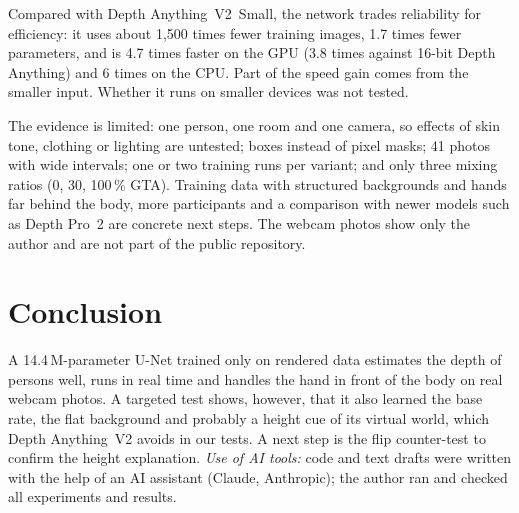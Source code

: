 \documentclass[../../proceedings/main.tex]{subfiles}
\begin{document}
\begin{refsection}
Compared with Depth Anything~V2~Small, the network trades reliability for
efficiency: it uses about 1{,}500 times fewer training images, 1.7 times fewer
parameters, and is 4.7 times faster on the GPU (3.8 times against 16-bit
Depth Anything) and 6 times on the CPU. Part of the speed gain comes from the
smaller input. Whether it runs on smaller devices was not tested.

The evidence is limited: one person, one room and one camera, so effects of
skin tone, clothing or lighting are untested; boxes instead of pixel masks; 41 photos with wide intervals; one or two training runs per
variant; and only three mixing ratios (0, 30, 100\,\% GTA). Training data with
structured backgrounds and hands far behind the body, more participants and a
comparison with newer models such as Depth Pro~2 are concrete next steps.
The webcam photos show only the author and are not part of the public
repository.

\section{Conclusion}
A 14.4\,M-parameter U-Net trained only on rendered data estimates the depth of
persons well, runs in real time and handles the hand in front of the body on
real webcam photos. A targeted test shows, however, that it also learned the
base rate, the flat background and probably a height cue of its virtual world,
which Depth Anything~V2 avoids in our tests. A next step is the flip
counter-test to confirm the height explanation. \emph{Use of AI tools:} code
and text drafts were written with the help of an AI assistant (Claude,
Anthropic); the author ran and checked all experiments and results.

\printbibliography[heading=subbibliography,title={References}]
\end{refsection}
\end{document}
